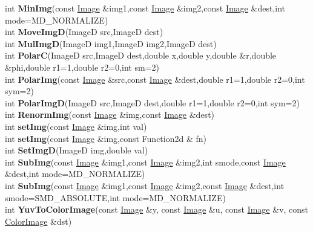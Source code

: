 \documentclass[10pt,titlepage]{article}
\def\functionlistentry#1#2#3#4#5#6{\noindent #1 {\bf #2}(#3) \dotfill #6\\}
\begin{document}
{{\functionlistentry{int}{MinImg}{const \hyperlink{Image}{Image} \&img1,const \hyperlink{Image}{Image} \&img2,const \hyperlink{Image}{Image} \&dest,int mode=MD\_NORMALIZE}{1091}{processing}{}
\functionlistentry{int}{MoveImgD}{ImageD src,ImageD dest}{1097}{processing}{}
\functionlistentry{int}{MulImgD}{ImageD img1,ImageD img2,ImageD dest}{1099}{processing}{}
\functionlistentry{int}{PolarC}{ImageD src,ImageD dest,double x,double y,double \&r,double \&phi,double r1=1,double r2=0,int sm=2}{1103}{processing}{}
\functionlistentry{int}{PolarImg}{const \hyperlink{Image}{Image} \&src,const \hyperlink{Image}{Image} \&dest,double r1=1,double r2=0,int sym=2}{1102}{processing}{}
\functionlistentry{int}{PolarImgD}{ImageD src,ImageD dest,double r1=1,double r2=0,int sym=2}{1101}{processing}{}
\functionlistentry{int}{RenormImg}{const \hyperlink{Image}{Image} \&img,const \hyperlink{Image}{Image} \&dest}{1094}{processing}{}
\functionlistentry{int}{setImg}{const \hyperlink{Image}{Image} \&img,int val}{1084}{processing}{}
\functionlistentry{int}{setImg}{const \hyperlink{Image}{Image} \&img,const Function2d \& fn}{1085}{processing}{}
\functionlistentry{int}{SetImgD}{ImageD img,double val}{1096}{processing}{}
\functionlistentry{int}{SubImg}{const \hyperlink{Image}{Image} \&img1,const \hyperlink{Image}{Image} \&img2,int smode,const \hyperlink{Image}{Image} \&dest,int mode=MD\_NORMALIZE}{1088}{processing}{}
\functionlistentry{int}{SubImg}{const \hyperlink{Image}{Image} \&img1,const \hyperlink{Image}{Image} \&img2,const \hyperlink{Image}{Image} \&dest,int smode=SMD\_ABSOLUTE,int mode=MD\_NORMALIZE}{1089}{processing}{}
\functionlistentry{int}{YuvToColorImage}{const \hyperlink{Image}{Image} \&y, const \hyperlink{Image}{Image} \&u, const \hyperlink{Image}{Image} \&v, const \hyperlink{ColorImage}{ColorImage} \&dst}{1112}{processing}{}

}}
\end{document}
